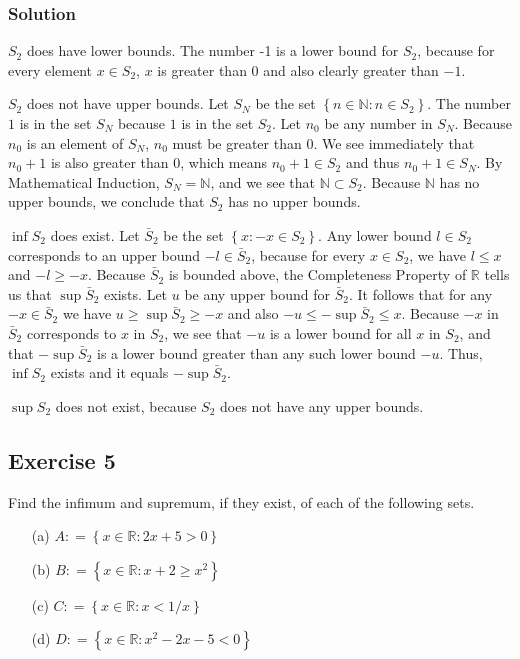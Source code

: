 \documentclass[12pt]{article}
\begin{document}
\subsubsection*{Solution}
$S_2$ does have lower bounds. The number -1 is a lower bound for $S_2$, because for every element $x \in S_2$, $x$ is greater than $0$ and also clearly greater than $-1$.

$S_2$ does not have upper bounds. Let $S_N$ be the set $\left\{n \in \mathbb{N} : n \in S_2\right\}$. The number $1$ is in the set $S_N$ because $1$ is in the set $S_2$. Let $n_0$ be any number in $S_N$. Because $n_0$ is an element of $S_N$, $n_0$ must be greater than $0$. We see immediately that $n_0 + 1$ is also greater than $0$, which means $n_0 + 1 \in S_2$ and thus $n_0 + 1 \in S_N$. By Mathematical Induction, $S_N = \mathbb{N}$, and we see that $\mathbb{N} \subset S_2$. Because $\mathbb{N}$ has no upper bounds, we conclude that $S_2$ has no upper bounds.

$\inf S_2$ does exist. Let $\bar{S}_2$ be the set $\left\{x : -x \in S_2\right\}$. Any lower bound $l \in S_2$ corresponds to an upper bound $-l \in \bar{S}_2$, because for every $x \in S_2$, we have $l \leq x$ and $-l \geq -x$. Because $\bar{S}_2$ is bounded above, the Completeness Property of $\mathbb{R}$ tells us that $\sup \bar{S}_2$ exists. Let $u$ be any upper bound for $\bar{S}_2$. It follows that for any $-x \in \bar{S}_2$ we have $u \geq \sup \bar{S}_2 \geq -x$ and also $-u \leq -\sup\bar{S}_2 \leq x$. Because $-x$ in $\bar{S}_2$ corresponds to $x$ in $S_2$, we see that $-u$ is a lower bound for all $x$ in $S_2$, and that $-\sup\bar{S}_2$ is a lower bound greater than any such lower bound $-u$. Thus, $\inf S_2$ exists and it equals $-\sup\bar{S}_2$.

$\sup S_2$ does not exist, because $S_2$ does not have any upper bounds.

\subsection*{Exercise 5}
Find the infimum and supremum, if they exist, of each of the following sets.
\begin{itemize}
\item[(a)] $A \mathrel{\mathop:}= \left\{x \in \mathbb{R} : 2x + 5 > 0\right\}$
\item[(b)] $B \mathrel{\mathop:}= \left\{x \in \mathbb{R} : x + 2 \geq x^2\right\}$
\item[(c)] $C \mathrel{\mathop:}= \left\{x \in \mathbb{R} : x < 1/x\right\}$
\item[(d)] $D \mathrel{\mathop:}= \left\{x \in \mathbb{R} : x^2 - 2x - 5 < 0\right\}$
\end{itemize}
\end{document}
